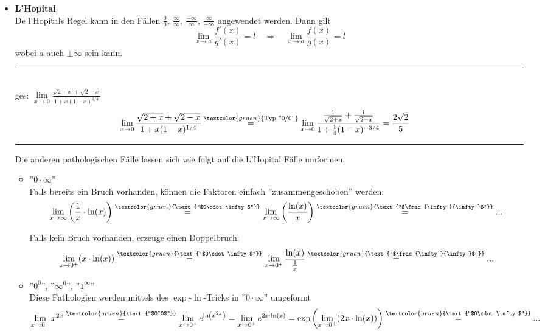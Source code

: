 \documentclass{article}
\newcommand{\lr}[1]{\left(#1\right)}
\newcommand{\comment}[1]{\textcolor{gruen}{\text{#1}}}
\begin{document}
\begin{itemize}
	\item \textbf{L'Hopital}\\
	De l'Hopitals Regel kann in den Fällen $\frac{0}{0},\ \frac{\infty}{\infty},\ \frac{-\infty}{\infty},\ \frac{\infty}{-\infty}$ angewendet werden. Dann gilt
		\begin{equation}
			\lim\limits_{x\rightarrow a} \frac{f'(x)}{g'(x)} = l \quad\Rightarrow\quad \lim\limits_{x\rightarrow a} \frac{f(x)}{g(x)} = l
		\end{equation}
	wobei $a$ auch $\pm\infty$ sein kann.

\vspace{0.5cm}

\begin{minipage}{\textwidth}
{\color{blue}
\hrule
	\\
	ges: $\lim\limits_{x\rightarrow 0} \frac{\sqrt{2 + x} + \sqrt{2 - x}}{1 + x (1 - x)^{1/4}}$
		\begin{align*}
			\lim\limits_{x\rightarrow 0} \frac{\sqrt{2 + x} + \sqrt{2 - x}}{1 + x (1 - x)^{1/4}} &\stackrel{\comment{Typ ''0/0''}}{=} \lim\limits_{x\rightarrow 0} \frac{\frac{1}{\sqrt{2 + x}} + \frac{1}{\sqrt{2 - x}}}{1 + \frac{1}{4}(1 - x)^{-3/4}} =  \frac{2\sqrt{2}}{5}
		\end{align*}
\hrule
} 
\end{minipage}

	Die anderen pathologischen Fälle lassen sich wie folgt auf die L'Hopital Fälle umformen.
	\begin{itemize}
		\item ''$0\cdot \infty$''\\
		Falls bereits ein Bruch vorhanden, können die Faktoren einfach ''zusammengeschoben'' werden:
			$$\lim\limits_{x\rightarrow\infty} \lr{\frac{1}{x} \cdot \ln(x)} \stackrel{\comment{''$0\cdot\infty$''}}{=} \lim\limits_{x\rightarrow\infty} \lr{\frac{\ln(x)}{x}} \stackrel{\comment{''$\frac{\infty}{\infty}$''}}{=} ...$$
		
		Falls kein Bruch vorhanden, erzeuge einen Doppelbruch:
			$$\lim\limits_{x\rightarrow 0^+} (x\cdot \ln(x)) \stackrel{\comment{''$0\cdot\infty$''}}{=} \lim\limits_{x\rightarrow 0^+} \frac{\ln(x)}{\frac{1}{x}} \stackrel{\comment{''$\frac{\infty}{\infty}$''}}{=} ...$$
		
		\item ''$0^0$'', ''$\infty^0$'', ''$1^\infty$''\\
		Diese Pathologien werden mittels des $\exp$-$\ln$-Tricks in ''$0\cdot \infty$'' umgeformt
			$$\lim\limits_{x\rightarrow 0^+} x^{2x} \stackrel{\comment{''$0^0$''}}{=} \lim\limits_{x\rightarrow 0^+} e^{\ln\lr{x^{2x}}} = \lim\limits_{x\rightarrow 0^+} e^{2x\cdot \ln(x)} = \exp\lr{{\lim\limits_{x\rightarrow 0^+} (2x\cdot \ln(x))}} \stackrel{\comment{''$0\cdot \infty$''}}{=} ...$$
			

\end{itemize}
\end{itemize}
\end{document}
